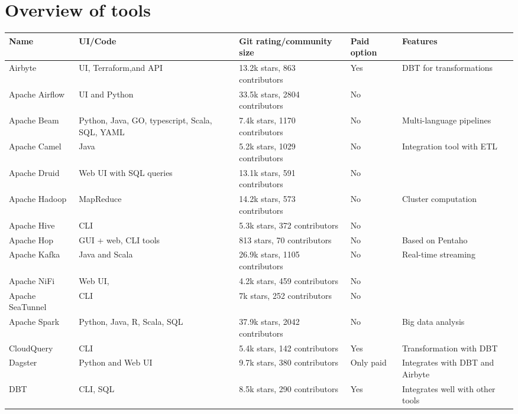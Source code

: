 \documentclass[11pt]{article}
\begin{document}
\onecolumn
\appendix

\section{Overview of tools}
\label{appendix:tools}
\begin{table}[H]
\centering
    \begin{tabular}[c]{|p{2cm}|p{4cm}|p{4cm}|p{1.5cm}|p{4cm}|}
    \hline
    \textbf{Name} & \textbf{UI/Code} & \textbf{Git rating/community size} & \textbf{Paid option} & \textbf{Features} \\ \hline
    Airbyte & UI, Terraform,and API & 13.2k stars, 863 contributors & Yes & DBT for transformations \\ \hline
    Apache Airflow & UI and Python & 33.5k stars, 2804 contributors & No &  \\ \hline
    Apache Beam & Python, Java, GO, typescript, Scala, SQL, YAML & 7.4k stars, 1170 contributors & No & Multi-language pipelines \\ \hline
    Apache Camel & Java & 5.2k stars, 1029 contributors & No & Integration tool with ETL \\ \hline
    Apache Druid & Web UI with SQL queries & 13.1k stars, 591 contributors & No &  \\ \hline
    Apache Hadoop & MapReduce & 14.2k stars, 573 contributors & No & Cluster computation \\ \hline
    Apache Hive & CLI & 5.3k stars, 372 contributors & No &  \\ \hline
    Apache Hop & GUI + web, CLI tools & 813 stars, 70 contributors & No & Based on Pentaho \\ \hline
    Apache Kafka & Java and Scala & 26.9k stars, 1105 contributors & No & Real-time streaming \\ \hline
    Apache NiFi & Web UI, & 4.2k stars, 459 contributors & No &  \\ \hline
    Apache SeaTunnel & CLI & 7k stars, 252 contributors & No &  \\ \hline
    Apache Spark & Python, Java, R, Scala, SQL & 37.9k stars, 2042 contributors & No & Big data analysis \\ \hline
    CloudQuery & CLI & 5.4k stars, 142 contributors & Yes & Transformation with DBT \\ \hline
    Dagster & Python and Web UI & 9.7k stars, 380 contributors & Only paid & Integrates with DBT and Airbyte \\ \hline
    DBT & CLI, SQL & 8.5k stars, 290 contributors & Yes & Integrates well with other tools \\ \hline

\end{tabular}
\end{table}
\end{document}
